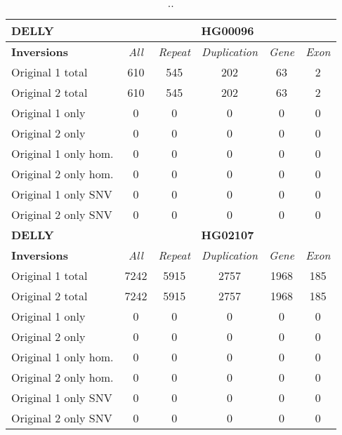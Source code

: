 \begin{table}[htb]
\begin{center}
\begin{tabular}{|l|c||c|c|c|c|}
\hline
{\bf DELLY} & \multicolumn{5}{|c|}{\bf HG00096} \\
\hline
\cline{2-6}
{\bf Inversions} & {\it All} & {\it Repeat} & {\it Duplication} & {\it Gene} & {\it Exon} \\
\hline
Original 1 total & 610 & 545 & 202 & 63 & 2\\ 
\hline
Original 2 total & 610 & 545 & 202 & 63 & 2\\ 
\hline
Original 1 only & 0 & 0 & 0 & 0 & 0\\ 
\hline
Original 2 only & 0 & 0 & 0 & 0 & 0\\ 
\hline
Original 1 only hom. & 0 & 0 & 0 & 0 & 0\\ 
\hline
Original 2 only hom. & 0 & 0 & 0 & 0 & 0\\ 
\hline
Original 1 only SNV & 0 & 0 & 0 & 0 & 0\\ 
\hline
Original 2 only SNV & 0 & 0 & 0 & 0 & 0\\ 
\hline
\hline
{\bf DELLY} & \multicolumn{5}{|c|}{\bf HG02107} \\
\hline
\cline{2-6}
{\bf Inversions} & {\it All} & {\it Repeat} & {\it Duplication} & {\it Gene} & {\it Exon} \\
\hline
Original 1 total & 7242 & 5915 & 2757 & 1968 & 185\\ 
\hline
Original 2 total & 7242 & 5915 & 2757 & 1968 & 185\\ 
\hline
Original 1 only & 0 & 0 & 0 & 0 & 0\\ 
\hline
Original 2 only & 0 & 0 & 0 & 0 & 0\\ 
\hline
Original 1 only hom. & 0 & 0 & 0 & 0 & 0\\ 
\hline
Original 2 only hom. & 0 & 0 & 0 & 0 & 0\\ 
\hline
Original 1 only SNV & 0 & 0 & 0 & 0 & 0\\ 
\hline
Original 2 only SNV & 0 & 0 & 0 & 0 & 0\\ 
\hline
\end{tabular}
\end{center}
\caption{ .. }
\label{tab:orig-vs-orig2-delly-inv}
\end{table}

